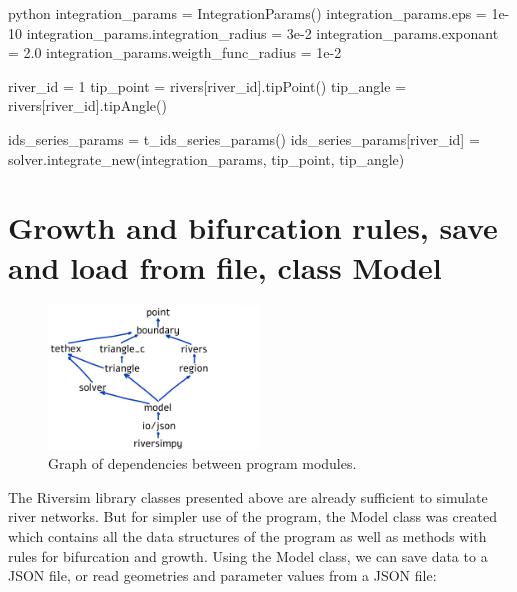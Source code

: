 \documentclass[]{pracamgr}
\begin{document}
        \begin{mintedbox}{python}
          integration_params = IntegrationParams()
          integration_params.eps = 1e-10
          integration_params.integration_radius = 3e-2
          integration_params.exponant = 2.0
          integration_params.weigth_func_radius = 1e-2        
          
          river_id = 1
          tip_point = rivers[river_id].tipPoint()
          tip_angle = rivers[river_id].tipAngle()

          ids_series_params = t_ids_series_params()
          ids_series_params[river_id] = solver.integrate_new(integration_params, tip_point, tip_angle)\end{mintedbox}

    \section{Growth and bifurcation rules, save and load from file, class Model}
      \begin{figure}[H]
        \centering
        \includegraphics[width=0.5\textwidth]{figs/program_dependecy_graph.png}        
        \caption{Graph of dependencies between program modules.}
        \label{program_strucutre}
      \end{figure}

    The Riversim library classes presented above are already sufficient to simulate river networks. But for simpler use of the program, the Model class was created which contains all the data structures of the program as well as methods with rules for bifurcation and growth. Using the Model class, we can save data to a JSON file, or read geometries and parameter values from a JSON file:
\end{document}
